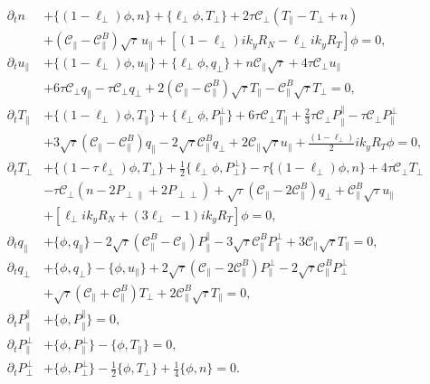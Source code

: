\documentclass{article}
\begin{document}
\begin{align}
\partial_t n &+ \{(1 - \ell_\perp)\phi, n\} + \{\ell_\perp \phi, T_\perp\} + 2\tau \mathcal{C}_\perp(T_\parallel - T_\perp + n) \nonumber\\
&+ (\mathcal{C}_\parallel - \mathcal{C}_\parallel^B)\sqrt{\tau}\, u_\parallel + \left[(1 - \ell_\perp)i k_y R_N - \ell_\perp i k_y R_T\right]\phi = 0,\\
\partial_t u_\parallel &+ \{(1 - \ell_\perp)\phi, u_\parallel\} + \{\ell_\perp \phi, q_\perp\} + n \mathcal{C}_\parallel\sqrt{\tau} + 4 \tau \mathcal{C}_\perp u_\parallel \nonumber\\
&+ 6\tau \mathcal{C}_\perp q_\parallel - \tau \mathcal{C}_\perp q_\perp + 2(\mathcal{C}_\parallel - \mathcal{C}_\parallel^B)\sqrt{\tau} T_\parallel - \mathcal{C}_\parallel^B\sqrt{\tau} T_\perp = 0,\\
\partial_t T_\parallel &+ \{(1 - \ell_\perp)\phi, T_\parallel\} + \{\ell_\perp \phi, P_\parallel^\perp\} + 6\tau \mathcal{C}_\perp T_\parallel + \frac{2}{3}\tau \mathcal{C}_\perp P_\parallel^\parallel - \tau \mathcal{C}_\perp P_\parallel^\perp \nonumber\\
&+ 3\sqrt{\tau}(\mathcal{C}_\parallel - \mathcal{C}_\parallel^B) q_\parallel - 2\sqrt{\tau} \mathcal{C}_\parallel^B q_\perp + 2 \mathcal{C}_\parallel\sqrt{\tau} u_\parallel + \frac{(1 - \ell_\perp)}{2}i k_y R_T \phi = 0,\\
\partial_t T_\perp &+ \{(1 - \tau \ell_\perp)\phi, T_\perp\} + \frac{1}{2}\{\ell_\perp \phi, P_\perp^\perp\} - \tau\{(1 - \ell_\perp)\phi, n\} + 4\tau \mathcal{C}_\perp T_\perp \nonumber\\
&- \tau \mathcal{C}_\perp(n - 2P_{\perp\parallel} + 2P_{\perp\perp}) + \sqrt{\tau}(\mathcal{C}_\parallel - 2\mathcal{C}_\parallel^B) q_\perp + \mathcal{C}_\parallel^B\sqrt{\tau} u_\parallel \nonumber\\
&+ \left[\ell_\perp i k_y R_N + (3\ell_\perp - 1) i k_y R_T\right]\phi = 0,\\
\partial_t q_\parallel &+ \{\phi, q_\parallel\} - 2\sqrt{\tau}(\mathcal{C}_\parallel^B - \mathcal{C}_\parallel)P_\parallel^\parallel - 3\sqrt{\tau} \mathcal{C}_\parallel^B P_\parallel^\perp + 3 \mathcal{C}_\parallel\sqrt{\tau} T_\parallel = 0,\\
\partial_t q_\perp &+ \{\phi, q_\perp\} - \{\phi, u_\parallel\} + 2\sqrt{\tau}(\mathcal{C}_\parallel - 2\mathcal{C}_\parallel^B)P_\parallel^\perp - 2\sqrt{\tau} \mathcal{C}_\parallel^B P_\perp^\perp \nonumber\\
&+ \sqrt{\tau}(\mathcal{C}_\parallel + \mathcal{C}_\parallel^B)T_\perp + 2 \mathcal{C}_\parallel^B\sqrt{\tau} T_\parallel = 0,\\
\partial_t P_\parallel^\parallel &+ \{\phi, P_\parallel^\parallel\} = 0, \\
\partial_t P_\parallel^\perp &+ \{\phi, P_\parallel^\perp\} - \{\phi, T_\parallel\} = 0, \\
\partial_t P_\perp^\perp &+ \{\phi, P_\perp^\perp\} - \frac{1}{2}\{\phi, T_\perp\} + \frac{1}{4}\{\phi, n\} = 0.
\end{align}
\end{document}
